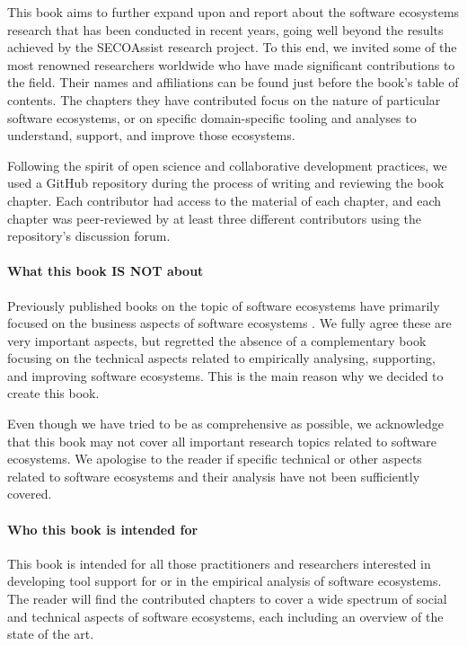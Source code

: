 This book aims to further expand upon and report about the software ecosystems research that has been conducted in recent years, going well beyond the results achieved by the SECOAssist research project.
To this end, we invited some of the most renowned researchers worldwide who have made significant contributions to the field.
Their names and affiliations can be found just before the book's table of contents.
The chapters they have contributed focus on the nature of particular software ecosystems, or on specific domain-specific tooling and analyses to understand, support, and improve those ecosystems.

Following the spirit of open science and collaborative development practices, we used a GitHub repository during the process of writing and reviewing the book chapter. Each contributor had access to the material of each chapter, and each chapter was peer-reviewed by at least three different contributors using the repository's discussion forum.

\paragraph{\textbf{What this book IS NOT about}}

Previously published books on the topic of software ecosystems have primarily focused on the business aspects of software ecosystems \cite{messerschmitt2003software,Popp2010,Jansen2013book}.
We fully agree these are very important aspects, but regretted the absence of a complementary book focusing on the technical aspects related to empirically analysing, supporting, and improving software ecosystems.
This is the main reason why we decided to create this book.

Even though we have tried to be as comprehensive as possible, we acknowledge that this book may not cover all important research topics related to software ecosystems. We apologise to the reader if specific technical or other aspects related to software ecosystems and their analysis have not been sufficiently covered.

\paragraph{\textbf{Who this book is intended for}}

This book is intended for all those practitioners and researchers interested in developing tool support for or in the empirical analysis of software ecosystems. The reader will find the contributed chapters to cover a wide spectrum of social and technical aspects of software ecosystems, each including an overview of the state of the art.

